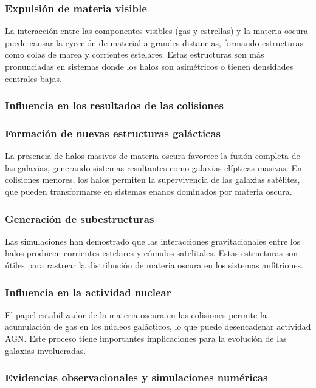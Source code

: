 \documentclass{article}
\begin{document}
\subsubsection*{Expulsión de materia visible}

La interacción entre las componentes visibles (gas y estrellas) y la materia oscura puede causar la eyección de material a grandes distancias, formando estructuras como colas de marea y corrientes estelares. Estas estructuras son más pronunciadas en sistemas donde los halos son asimétricos o tienen densidades centrales bajas.
\subsubsection{Influencia en los resultados de las colisiones}
\subsubsection*{Formación de nuevas estructuras galácticas}

La presencia de halos masivos de materia oscura favorece la fusión completa de las galaxias, generando sistemas resultantes como galaxias elípticas masivas.
En colisiones menores, los halos permiten la supervivencia de las galaxias satélites, que pueden transformarse en sistemas enanos dominados por materia oscura.
\subsubsection*{Generación de subestructuras}

Las simulaciones han demostrado que las interacciones gravitacionales entre los halos producen corrientes estelares y cúmulos satelitales. Estas estructuras son útiles para rastrear la distribución de materia oscura en los sistemas anfitriones.
\subsubsection*{Influencia en la actividad nuclear}

El papel estabilizador de la materia oscura en las colisiones permite la acumulación de gas en los núcleos galácticos, lo que puede desencadenar actividad AGN. Este proceso tiene importantes implicaciones para la evolución de las galaxias involucradas.
\subsubsection{Evidencias observacionales y simulaciones numéricas}
\end{document}

